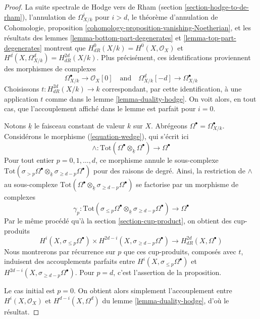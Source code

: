 \begin{proof}
La suite spectrale de Hodge vers de Rham
(section \ref{section-hodge-to-de-rham}), l'annulation
de $\Omega^i_{X/k}$ pour $i > d$, le théorème d'annulation de
Cohomologie, proposition \ref{cohomology-proposition-vanishing-Noetherian},
et les résultats des lemmes \ref{lemma-bottom-part-degenerates} et
\ref{lemma-top-part-degenerates}
montrent que $H^0_{dR}(X/k) = H^0(X, \mathcal{O}_X)$
et $H^d(X, \Omega^d_{X/k}) = H_{dR}^{2d}(X/k)$.
Plus précisément, ces identifications proviennent des morphismes
de complexes
$$
\Omega^\bullet_{X/k} \to \mathcal{O}_X[0]
\quad\text{and}\quad
\Omega^d_{X/k}[-d] \to \Omega^\bullet_{X/k}
$$
Choisissons $t : H_{dR}^{2d}(X/k) \to k$ correspondant, par cette identification,
à une application $t$ comme dans le lemme \ref{lemma-duality-hodge}.
On voit alors, en tout cas, que l'accouplement affiché dans le lemme
est parfait pour $i = 0$.

\medskip\noindent
Notons $\underline{k}$ le faisceau constant de valeur $k$ sur $X$.
Abrégeons $\Omega^\bullet = \Omega^\bullet_{X/k}$.
Considérons le morphisme (\ref{equation-wedge}), qui s'écrit ici
$$
\wedge :
\text{Tot}(\Omega^\bullet \otimes_{\underline{k}} \Omega^\bullet)
\longrightarrow
\Omega^\bullet
$$
Pour tout entier $p = 0, 1, \ldots, d$, ce morphisme
annule le sous-complexe
$\text{Tot}(\sigma_{> p} \Omega^\bullet \otimes_{\underline{k}}
\sigma_{\geq d - p} \Omega^\bullet)$ pour des raisons de degré.
Ainsi, la restriction de $\wedge$ au sous-complexe
$\text{Tot}(\Omega^\bullet \otimes_{\underline{k}}
\sigma_{\geq d - p}\Omega^\bullet)$ se factorise par un morphisme de complexes
$$
\gamma_p :
\text{Tot}(\sigma_{\leq p} \Omega^\bullet \otimes_{\underline{k}}
\sigma_{\geq d - p} \Omega^\bullet)
\longrightarrow
\Omega^\bullet
$$
Par le même procédé qu'à la section \ref{section-cup-product}, on obtient des
cup-produits
$$
H^i(X, \sigma_{\leq p} \Omega^\bullet) \times
H^{2d - i}(X, \sigma_{\geq d - p}\Omega^\bullet)
\longrightarrow
H_{dR}^{2d}(X, \Omega^\bullet)
$$
Nous montrerons par récurrence sur $p$ que ces cup-produits, composés avec $t$,
induisent des accouplements parfaits entre $H^i(X, \sigma_{\leq p} \Omega^\bullet)$
et $H^{2d - i}(X, \sigma_{\geq d - p}\Omega^\bullet)$. Pour $p = d$,
c'est l'assertion de la proposition.

\medskip\noindent
Le cas initial est $p = 0$. On obtient alors simplement l'accouplement
entre $H^i(X, \mathcal{O}_X)$ et $H^{d - i}(X, \Omega^d)$ du
lemme \ref{lemma-duality-hodge}, d'où le résultat.


\end{proof}
